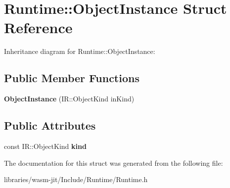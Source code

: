 \hypertarget{struct_runtime_1_1_object_instance}{}\section{Runtime\+:\+:Object\+Instance Struct Reference}
\label{struct_runtime_1_1_object_instance}


Inheritance diagram for Runtime\+:\+:Object\+Instance\+:
\subsection*{Public Member Functions}
\begin{DoxyCompactItemize}
\item 
\mbox{\label{struct_runtime_1_1_object_instance_af7231f91092e2c8d8f65491f648504b5}} 
{\bfseries Object\+Instance} (I\+R\+::\+Object\+Kind in\+Kind)
\end{DoxyCompactItemize}
\subsection*{Public Attributes}
\begin{DoxyCompactItemize}
\item 
\mbox{\label{struct_runtime_1_1_object_instance_a0d77f442a8f7418381f356c31795d8db}} 
const I\+R\+::\+Object\+Kind {\bfseries kind}
\end{DoxyCompactItemize}


The documentation for this struct was generated from the following file\+:\begin{DoxyCompactItemize}
\item 
libraries/wasm-\/jit/\+Include/\+Runtime/Runtime.\+h\end{DoxyCompactItemize}
